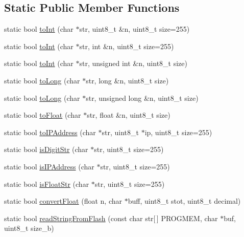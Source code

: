 \subsection*{Static Public Member Functions}
\begin{DoxyCompactItemize}
\item 
static bool \hyperlink{classsmrtobj_1_1parser_1_1_string_parser_a286ba7afb015d6101dce638ca639980e}{to\+Int} (char $\ast$str, uint8\+\_\+t \&n, uint8\+\_\+t size=255)
\item 
static bool \hyperlink{classsmrtobj_1_1parser_1_1_string_parser_a238387a4fcadf8f9e5eb84d52e46d054}{to\+Int} (char $\ast$str, int \&n, uint8\+\_\+t size=255)
\item 
static bool \hyperlink{classsmrtobj_1_1parser_1_1_string_parser_a60d66796fdacb1b3a93603d48ce81c6b}{to\+Int} (char $\ast$str, unsigned int \&n, uint8\+\_\+t size)
\item 
static bool \hyperlink{classsmrtobj_1_1parser_1_1_string_parser_ad2dd013347a1bb807549e3aa1ec1bff6}{to\+Long} (char $\ast$str, long \&n, uint8\+\_\+t size)
\item 
static bool \hyperlink{classsmrtobj_1_1parser_1_1_string_parser_a8545f1404542abfac2ccb15675ed4891}{to\+Long} (char $\ast$str, unsigned long \&n, uint8\+\_\+t size)
\item 
static bool \hyperlink{classsmrtobj_1_1parser_1_1_string_parser_a8e36c1d12527b4120cbde1bbbdc18562}{to\+Float} (char $\ast$str, float \&n, uint8\+\_\+t size)
\item 
static bool \hyperlink{classsmrtobj_1_1parser_1_1_string_parser_a35408e896e31a3de9271f4950d8ed891}{to\+I\+P\+Address} (char $\ast$str, uint8\+\_\+t $\ast$ip, uint8\+\_\+t size=255)
\item 
static bool \hyperlink{classsmrtobj_1_1parser_1_1_string_parser_a454373fb32886498a684d49b49897474}{is\+Digit\+Str} (char $\ast$str, uint8\+\_\+t size=255)
\item 
static bool \hyperlink{classsmrtobj_1_1parser_1_1_string_parser_a7584c8c2b0859c1160cb4fc1ece14e2d}{is\+I\+P\+Address} (char $\ast$str, uint8\+\_\+t size=255)
\item 
static bool \hyperlink{classsmrtobj_1_1parser_1_1_string_parser_a2dc94649a00e706b4ce7d62cc6d6fd11}{is\+Float\+Str} (char $\ast$str, uint8\+\_\+t size=255)
\item 
static bool \hyperlink{classsmrtobj_1_1parser_1_1_string_parser_aeafed5972a553a95c9a1cd0b6f77f771}{convert\+Float} (float n, char $\ast$buff, uint8\+\_\+t stot, uint8\+\_\+t decimal)
\item 
static bool \hyperlink{classsmrtobj_1_1parser_1_1_string_parser_a532a1adbdd310bb30f64a26565f0cb77}{read\+String\+From\+Flash} (const char str\mbox{[}$\,$\mbox{]} P\+R\+O\+G\+M\+E\+M, char $\ast$buf, uint8\+\_\+t size\+\_\+b)
\end{DoxyCompactItemize}


